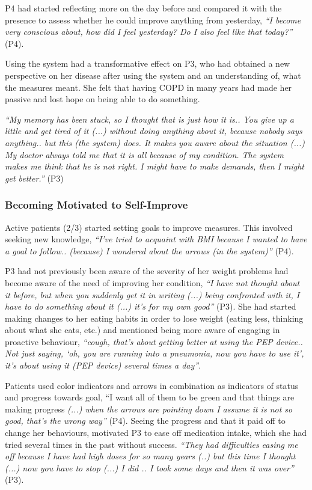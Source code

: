 P4 had started reflecting more on the day before and compared it with the presence to assess whether he could improve anything from yesterday, \textit{“I become very conscious about, how did I feel yesterday? Do I also feel like that today?”} (P4).

Using the system had a transformative effect on P3, who had obtained a new perspective on her disease after using the system and an understanding of, what the measures meant. She felt that having COPD in many years had made her passive and lost hope on being able to do something. 

\textit{“My memory has been stuck, so I thought that is just how it is.. You give up a little and get tired of it (...) without doing anything about it, because nobody says anything.. but this (the system) does. It makes you aware about the situation (...) My doctor always told me that it is all because of my condition. The system makes me think that he is not right. I might have to make demands, then I might get better.”} (P3) 

\subsubsection{Becoming Motivated to Self-Improve}
Active patients (2/3) started setting goals to improve measures. This involved seeking new knowledge, \textit{“I’ve tried to acquaint with BMI because I wanted to have a goal to follow.. (because) I wondered about the arrows (in the system)”} (P4). 

P3 had not previously been aware of the severity of her weight problems had become aware of the need of improving her condition, \textit{“I have not thought about it before, but when you suddenly get it in writing (...) being confronted with it, I have to do something about it (...) it’s for my own good”} (P3). She had started making changes to her eating habits in order to lose weight (eating less, thinking about what she eats, etc.) and mentioned being more aware of engaging in proactive behaviour, \textit{“cough, that’s about getting better at using the PEP device.. Not just saying, ‘oh, you are running into a pneumonia, now you have to use it’, it’s about using it (PEP device) several times a day”}. 

Patients used color indicators and arrows in combination as indicators of status and progress towards goal, “I want all of them to be green and that things are making progress \textit{(...) when the arrows are pointing down I assume it is not so good, that’s the wrong way”} (P4).  Seeing the progress and that it paid off to change her behaviours, motivated P3 to ease off medication intake, which she had tried several times in the past without success. \textit{“They had difficulties easing me off because I have had high doses for so many years (..) but this time I thought (...) now you have to stop (...) I did .. I took some days and then it was over”} (P3). 

